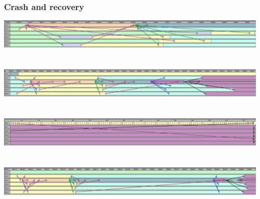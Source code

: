 \begin{frame}
\frametitle{ Crash and recovery}

\includegraphics[width=\textwidth]{figures/trace4a.pdf}
~\\~\\
\includegraphics[width=\textwidth]{figures/trace4b.pdf}
~\\~\\
\includegraphics[width=\textwidth]{figures/trace4c.pdf}%
~\\~\\
\includegraphics[width=\textwidth]{figures/trace4d.pdf}%

\end{frame}


%
%


